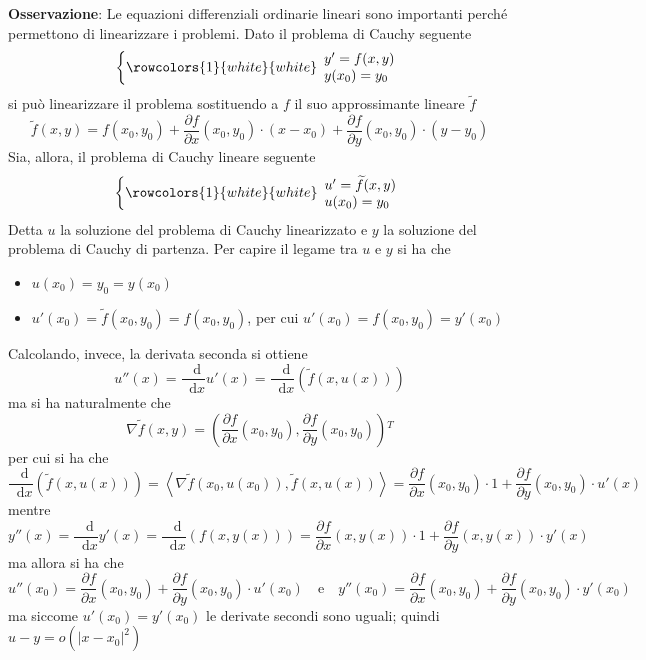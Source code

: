 \documentclass[a4paper]{extarticle}
\newcommand*\dif{\mathop{}\!\mathrm{d}}
\begin{document}
\vspace{2em}
\noindent
\textbf{Osservazione}: Le equazioni differenziali ordinarie lineari sono importanti perché permettono di linearizzare i problemi. Dato il problema di Cauchy seguente
\[\left\{
    \rowcolors{1}{white}{white}
    \begin{array}{lll}
        y'=f(x,y)\\
        y(x_0)=y_0\\
    \end{array}
\right.\]
si può linearizzare il problema sostituendo a $f$ il suo approssimante lineare $\widetilde{f}$
\[\widetilde{f}(x,y)=f(x_0,y_0) + \dfrac{\partial f}{\partial x}(x_0,y_0) \cdot (x-x_0) + \dfrac{\partial f}{\partial y}(x_0,y_0) \cdot (y-y_0)\]
Sia, allora, il problema di Cauchy lineare seguente
\[\left\{
    \rowcolors{1}{white}{white}
    \begin{array}{lll}
        u'=\widetilde{f}(x,y)\\
        u(x_0)=y_0\\
    \end{array}
\right.\]
Detta $u$ la soluzione del problema di Cauchy linearizzato e $y$ la soluzione del problema di Cauchy di partenza. Per capire il legame tra $u$ e $y$ si ha che
\begin{itemize}
    \item $u(x_0) = y_0 = y(x_0)$
    \item $u'(x_0) = \widetilde{f}(x_0,y_0) = f(x_0,y_0)$, per cui $u'(x_0)=f(x_0,y_0)=y'(x_0)$
\end{itemize}
Calcolando, invece, la derivata seconda si ottiene
\[u''(x)=\dfrac{\dif}{\dif x} u'(x) = \dfrac{\dif}{\dif x} \left(\widetilde{f}(x,u(x))\right)\]
ma si ha naturalmente che
\[\nabla \widetilde{f}(x,y) = \left(\dfrac{\partial f}{\partial x}(x_0,y_0), \dfrac{\partial f}{\partial y}(x_0,y_0)\right){^T}\]
per cui si ha che
\[\dfrac{\dif}{\dif x} \left(\widetilde{f}(x,u(x))\right) = \left<\nabla \widetilde{f}(x_0,u(x_0)), \widetilde{f}(x,u(x))\right> = \dfrac{\partial f}{\partial x} (x_0,y_0) \cdot 1 + \dfrac{\partial f}{\partial y} (x_0,y_0) \cdot u'(x)\]
mentre
\[y''(x) = \dfrac{\dif}{\dif x} y'(x) = \dfrac{\dif}{\dif x} \left(f(x,y(x))\right) = \dfrac{\partial f}{\partial x} (x,y(x)) \cdot 1 + \dfrac{\partial f}{\partial y} (x,y(x)) \cdot y'(x)\]
ma allora si ha che
\[u''(x_0)=\dfrac{\partial f}{\partial x}(x_0,y_0) + \dfrac{\partial f}{\partial y}(x_0,y_0) \cdot u'(x_0) \hspace{1em} \text{e} \hspace{1em} y''(x_0)=\dfrac{\partial f}{\partial x}(x_0,y_0) + \dfrac{\partial f}{\partial y}(x_0,y_0) \cdot y'(x_0)\]
ma siccome $u'(x_0) = y'(x_0)$ le derivate secondi sono uguali; quindi $u-y=o(\left\vert x-x_0\right\vert^2)$
\end{document}
